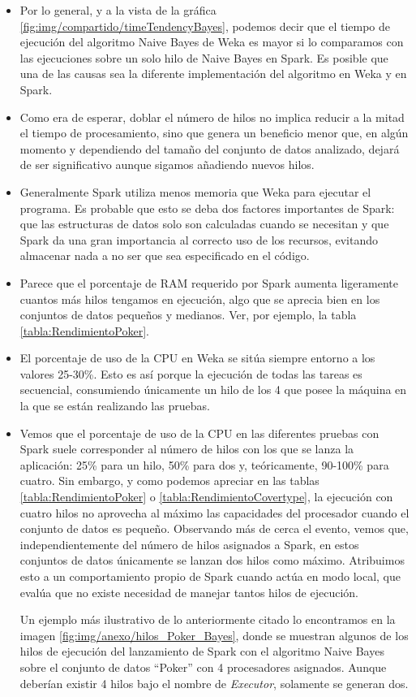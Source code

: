 \begin{itemize}
	\item Por lo general, y a la vista de la gráfica \ref{fig:img/compartido/timeTendencyBayes}, podemos decir que el tiempo de ejecución del algoritmo Naive Bayes de Weka es mayor si lo comparamos con las ejecuciones sobre un solo hilo de Naive Bayes en Spark. Es posible que una de las causas sea la diferente implementación del algoritmo en Weka y en Spark.
	\item Como era de esperar, doblar el número de hilos no implica reducir a la mitad el tiempo de procesamiento, sino que genera un beneficio menor que, en algún momento y dependiendo del tamaño del conjunto de datos analizado, dejará de ser significativo aunque sigamos añadiendo nuevos hilos.
	\item Generalmente Spark utiliza menos memoria que Weka para ejecutar el programa. Es probable que esto se deba dos factores importantes de Spark: que las estructuras de datos solo son calculadas cuando se necesitan y que Spark da una gran importancia al correcto uso de los recursos, evitando almacenar nada a no ser que sea especificado en el código.
	\item Parece que el porcentaje de RAM requerido por Spark aumenta ligeramente cuantos más hilos tengamos en ejecución, algo que se aprecia bien en los conjuntos de datos pequeños y medianos. Ver, por ejemplo, la tabla \ref{tabla:RendimientoPoker}.
	\item El porcentaje de uso de la CPU en Weka se sitúa siempre entorno a los valores 25-30\%. Esto es así porque la ejecución de todas las tareas es secuencial, consumiendo únicamente un hilo de los 4 que posee la máquina en la que se están realizando las pruebas.
	\item Vemos que el porcentaje de uso de la CPU en las diferentes pruebas con Spark suele corresponder al número de hilos con los que se lanza la aplicación: 25\% para un hilo, 50\% para dos y, teóricamente, 90-100\% para cuatro. Sin embargo, y como podemos apreciar en las tablas \ref{tabla:RendimientoPoker} o \ref{tabla:RendimientoCovertype}, la ejecución con cuatro hilos no aprovecha al máximo las capacidades del procesador cuando el conjunto de datos es pequeño. Observando más de cerca el evento, vemos que, independientemente del número de hilos asignados a Spark, en estos conjuntos de datos únicamente se lanzan dos hilos como máximo. Atribuimos esto a un comportamiento propio de Spark cuando actúa en modo local, que evalúa que no existe necesidad de manejar tantos hilos de ejecución.
	
	Un ejemplo más ilustrativo de lo anteriormente citado lo encontramos en la imagen \ref{fig:img/anexo/hilos_Poker_Bayes}, donde se muestran algunos de los hilos de ejecución del lanzamiento de Spark con el algoritmo Naive Bayes sobre el conjunto de datos ``Poker''  con 4 procesadores asignados. Aunque deberían existir 4 hilos bajo el nombre de \textit{Executor}, solamente se generan dos.
	
\end{itemize}


